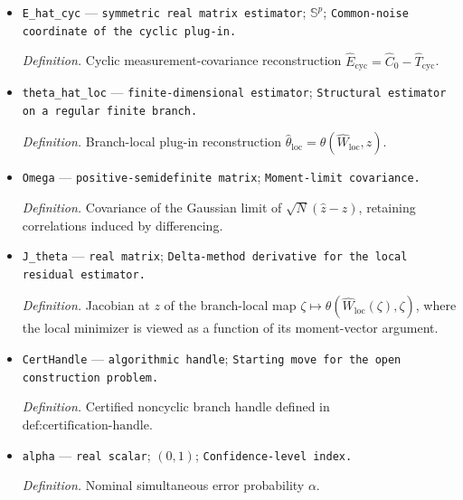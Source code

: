 \documentclass{article}
\begin{document}
\begin{itemize}
  \par\smallskip\noindent\emph{Definition.} Cyclic Stein reconstruction \(\widehat T_{\mathrm{cyc}}-\widehat W_{\mathrm{cyc}}\widehat T_{\mathrm{cyc}}\widehat W_{\mathrm{cyc}}^{\mathsf T}=\widehat C_0-\widehat C_1\), whenever the Stein operator is invertible.
  \item \texttt{E\_\allowbreak{}hat\_\allowbreak{}cyc} --- \texttt{symmetric real matrix estimator}; \(\mathbb S^p\); \texttt{Common-\allowbreak{}noise coordinate of the cyclic plug-\allowbreak{}in.}
  \par\smallskip\noindent\emph{Definition.} Cyclic measurement-covariance reconstruction \(\widehat E_{\mathrm{cyc}}=\widehat C_0-\widehat T_{\mathrm{cyc}}\).
  \item \texttt{theta\_\allowbreak{}hat\_\allowbreak{}loc} --- \texttt{finite-\allowbreak{}dimensional estimator}; \texttt{Structural estimator on a regular finite branch.}
  \par\smallskip\noindent\emph{Definition.} Branch-local plug-in reconstruction \(\widehat\theta_{\mathrm{loc}}=\theta(\widehat W_{\mathrm{loc}},\widehat z)\).
  \item \texttt{Omega} --- \texttt{positive-\allowbreak{}semidefinite matrix}; \texttt{Moment-\allowbreak{}limit covariance.}
  \par\smallskip\noindent\emph{Definition.} Covariance of the Gaussian limit of \(\sqrt N(\widehat z-z)\), retaining correlations induced by differencing.
  \item \texttt{J\_\allowbreak{}theta} --- \texttt{real matrix}; \texttt{Delta-\allowbreak{}method derivative for the local residual estimator.}
  \par\smallskip\noindent\emph{Definition.} Jacobian at \(z\) of the branch-local map \(\zeta\mapsto\theta(\widehat W_{\mathrm{loc}}(\zeta),\zeta)\), where the local minimizer is viewed as a function of its moment-vector argument.
  \item \texttt{CertHandle} --- \texttt{algorithmic handle}; \texttt{Starting move for the open construction problem.}
  \par\smallskip\noindent\emph{Definition.} Certified noncyclic branch handle defined in \(\text{def:certification-handle}\).
  \item \texttt{alpha} --- \texttt{real scalar}; \((0,1)\); \texttt{Confidence-\allowbreak{}level index.}
  \par\smallskip\noindent\emph{Definition.} Nominal simultaneous error probability \(\alpha\).
\end{itemize}
\end{document}
